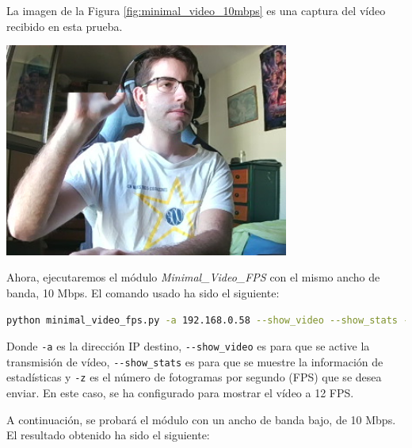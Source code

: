 La imagen de la Figura \ref{fig:minimal_video_10mbps} es una captura del vídeo recibido en esta prueba.
\begin{center}
  \includegraphics[width = 0.7\textwidth]{images/VideoRecibido2.1.png}
  \label{fig:minimal_video_10mbps}
\end{center}

\newpage

Ahora, ejecutaremos el módulo \textit{Minimal\_Video\_FPS} con el mismo ancho de banda, 10 Mbps. El comando usado ha sido el siguiente:
\begin{lstlisting}[language=bash, basicstyle=\ttfamily\scriptsize]
    python minimal_video_fps.py -a 192.168.0.58 --show_video --show_stats -z 12
\end{lstlisting}
Donde \verb|-a| es la dirección IP destino, \verb|--show_video| es para que se active la transmisión de vídeo, \verb|--show_stats| es para que se muestre la información de estadísticas y \verb|-z| es el número de fotogramas por segundo (FPS) que se desea enviar. En este caso, se ha configurado para mostrar el vídeo a 12 FPS.

A continuación, se probará el módulo con un ancho de banda bajo, de 10 Mbps. El resultado obtenido ha sido el siguiente:
\vspace{\baselineskip}

